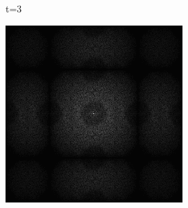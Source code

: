 \begin{figure}[H]
\begin{tcolorbox}[boxrule=4pt,sharp corners=downhill,title=Sortieren]
\begin{subfigure}[b]{0.2\textwidth}
        \caption{t=3}
        \label{pic:sorting_t3}
    \end{subfigure}
    \begin{subfigure}[b]{0.2\textwidth}
        \centering
        \includegraphics[width=\textwidth]{content/TemporalerAlg/Bilder/Sorting/Spektren/Ausschnitt3.png}
        \label{pic:sorting_t3_FFT}
    \end{subfigure}
    \begin{subfigure}[b]{0.1\textwidth}
        \hspace*{1cm}
    \end{subfigure}
    \begin{subfigure}[b]{0.2\textwidth}
        \centering

\end{subfigure}
\end{tcolorbox}
\end{figure}
